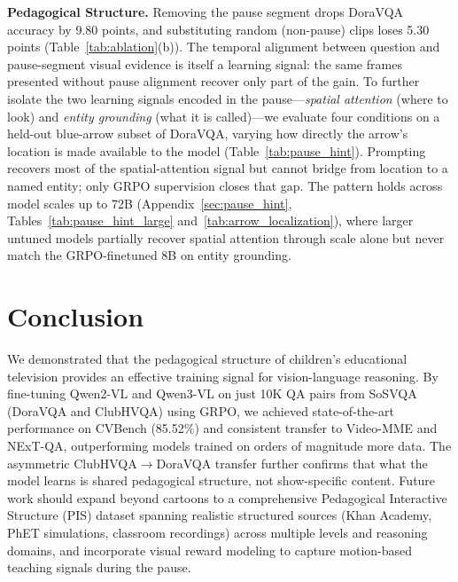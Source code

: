 \documentclass{article}
\begin{document}
\noindent\textbf{Pedagogical Structure.} Removing the pause segment drops DoraVQA accuracy by 9.80 points, and substituting random (non-pause) clips loses 5.30 points (Table~\ref{tab:ablation}(b)). The temporal alignment between question and pause-segment visual evidence is itself a learning signal: the same frames presented without pause alignment recover only part of the gain. To further isolate the two learning signals encoded in the pause—\textit{spatial attention} (where to look) and \textit{entity grounding} (what it is called)—we evaluate four conditions on a held-out blue-arrow subset of DoraVQA, varying how directly the arrow's location is made available to the model (Table~\ref{tab:pause_hint}). Prompting recovers most of the spatial-attention signal but cannot bridge from location to a named entity; only GRPO supervision closes that gap. The pattern holds across model scales up to 72B (Appendix~\ref{sec:pause_hint}, Tables~\ref{tab:pause_hint_large} and~\ref{tab:arrow_localization}), where larger untuned models partially recover spatial attention through scale alone but never match the GRPO-finetuned 8B on entity grounding.



\section{Conclusion}
We demonstrated that the pedagogical structure of children's educational television provides an effective training signal for vision-language reasoning. By fine-tuning Qwen2-VL and Qwen3-VL on just 10K QA pairs from SoSVQA (DoraVQA and ClubHVQA) using GRPO, we achieved state-of-the-art performance on CVBench (85.52\%) and consistent transfer to Video-MME and NExT-QA, outperforming models trained on orders of magnitude more data. The asymmetric ClubHVQA$\rightarrow$DoraVQA transfer further confirms that what the model learns is shared pedagogical structure, not show-specific content. Future work should expand beyond cartoons to a comprehensive Pedagogical Interactive Structure (PIS) dataset spanning realistic structured sources (Khan Academy, PhET simulations, classroom recordings) across multiple levels and reasoning domains, and incorporate visual reward modeling to capture motion-based teaching signals during the pause.
\end{document}
